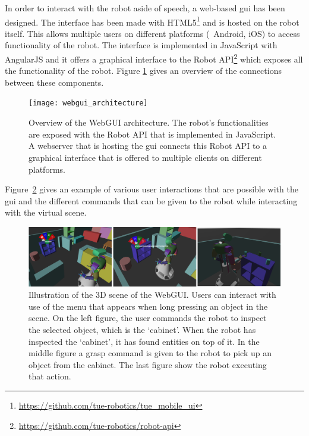 In order to interact with the robot aside of speech, a web-based \gls{gui} has been designed.
The interface has been made with 
HTML5\footnote{\url{https://github.com/tue-robotics/tue\_mobile\_ui}} and is hosted on the robot itself.
This allows multiple users on different platforms (\eg\ Android, iOS) to access functionality of the robot. The interface is implemented in JavaScript with AngularJS and it offers a graphical interface to the Robot API\footnote{\url{https://github.com/tue-robotics/robot-api}} which exposes all the functionality of the robot.
Figure \ref{fig:webgui_architecture} gives an overview of the connections between these components.
\begin{figure}[h]
    \centering
	\texttt{[image: webgui\_architecture]}
	\caption{
		Overview of the WebGUI architecture.
		The robot's functionalities are exposed with the Robot API that is implemented in JavaScript.
		A webserver that is hosting the \protect\gls{gui} connects this Robot API to a graphical interface that is offered to multiple clients on different platforms.}
	\label{fig:webgui_architecture}
\end{figure}
Figure~\ref{fig:gui_actions} gives an example of various user interactions that are possible with the \gls{gui} and the different commands that can be given to the robot while interacting with the virtual scene.

\begin{figure}[H]
	\includegraphics[width=\linewidth]{Figures/gui_actions}
	\caption{
		Illustration of the 3D scene of the WebGUI.
		Users can interact with use of the menu that appears when long pressing an object in the scene.
		On the left figure, the user commands the robot to inspect the selected object, which is the `cabinet'.
		When the robot has inspected the `cabinet', it has found entities on top of it.
		In the middle figure a grasp command is given to the robot to pick up an object from the cabinet.
		The last figure show the robot executing that action.}
	\label{fig:gui_actions}
\end{figure}
